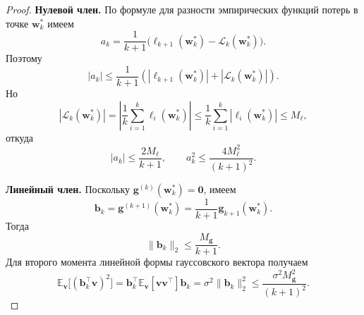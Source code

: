 \begin{proof}
    \textbf{Нулевой член.}
    По формуле для разности эмпирических функций потерь в точке $\mathbf w_k^*$
    имеем
    \begin{equation}
        \label{eq:squared-criterion-general-proof-step5}
        a_k
        =
        \frac{1}{k+1}
        \Big(
            \ell_{k+1}(\mathbf w_k^*)-\mathcal L_k(\mathbf w_k^*)
        \Big).
    \end{equation}
    Поэтому
    \begin{equation}
        \label{eq:squared-criterion-general-proof-step6}
        |a_k|
        \leqslant
        \frac{1}{k+1}
        \left(
            |\ell_{k+1}(\mathbf w_k^*)|
            +
            |\mathcal L_k(\mathbf w_k^*)|
        \right).
    \end{equation}
    Но
    \begin{equation}
        \label{eq:squared-criterion-general-proof-step7}
        |\mathcal L_k(\mathbf w_k^*)|
        =
        \left|
            \frac{1}{k}\sum_{i=1}^k \ell_i(\mathbf w_k^*)
        \right|
        \leqslant
        \frac{1}{k}\sum_{i=1}^k |\ell_i(\mathbf w_k^*)|
        \leqslant
        M_\ell,
    \end{equation}
    откуда
    \begin{equation}
        \label{eq:squared-criterion-general-proof-step8}
        |a_k|
        \leqslant
        \frac{2M_\ell}{k+1},
        \qquad
        a_k^2
        \leqslant
        \frac{4M_\ell^2}{(k+1)^2}.
    \end{equation}

    \textbf{Линейный член.}
    Поскольку $\mathbf g^{(k)}(\mathbf w_k^*)=\mathbf 0$, имеем
    \begin{equation}
        \label{eq:squared-criterion-general-proof-step9}
        \mathbf b_k
        =
        \mathbf g^{(k+1)}(\mathbf w_k^*)
        =
        \frac{1}{k+1}\mathbf g_{k+1}(\mathbf w_k^*).
    \end{equation}
    Тогда
    \begin{equation}
        \label{eq:squared-criterion-general-proof-step10}
        \|\mathbf b_k\|_2
        \leqslant
        \frac{M_{\mathbf g}}{k+1}.
    \end{equation}
    Для второго момента линейной формы гауссовского вектора получаем
    \begin{equation}
        \label{eq:squared-criterion-general-proof-step11}
        \mathbb E_{\mathbf v}\big[(\mathbf b_k^\top \mathbf v)^2\big]
        =
        \mathbf b_k^\top \mathbb E_{\mathbf v}[\mathbf v\mathbf v^\top]\mathbf b_k
        =
        \sigma^2 \|\mathbf b_k\|_2^2
        \leqslant
        \frac{\sigma^2 M_{\mathbf g}^2}{(k+1)^2}.
    \end{equation}


\end{proof}

